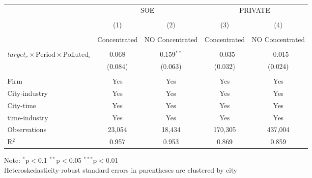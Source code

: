\documentclass[12pt]{article}
\begin{document}
\begin{table}[!htb]
\begin{adjustbox}{width=\textwidth, totalheight=\baselineskip,keepaspectratio}
\begin{tabular}{@{\extracolsep{5pt}}lcccc}
\\[-1.8ex]
            &\multicolumn{2}{c}{SOE}&\multicolumn{2}{c}{PRIVATE}\\
\\[-1.8ex] & (1) & (2) & (3) & (4)\\
 \\[-1.8ex]& Concentrated & NO Concentrated & Concentrated & NO Concentrated\\
 \hline \\[-1.8ex] 
   $target_c \times \text{Period} \times \text{Polluted}_i$  & 0.068 & 0.159$^{**}$ & $-$0.035 & $-$0.015 \\ 
  & (0.084) & (0.063) & (0.032) & (0.024) \\ 
 \hline \\[-1.8ex] 
Firm & Yes & Yes & Yes & Yes \\ 
City-industry & Yes & Yes & Yes & Yes \\ 
City-time & Yes & Yes & Yes & Yes \\ 
time-industry & Yes & Yes & Yes & Yes \\ 
Observations & 23,054 & 18,434 & 170,305 & 437,004 \\ 
R$^{2}$ & 0.957 & 0.953 & 0.869 & 0.859 \\ 
    \end{tabular}
    \end{adjustbox}
    \begin{tablenotes}
      \small
      \item 
      Note: $^{*}$p$<$0.1 $^{**}$p$<$0.05 $^{***}$p$<$0.01 \\
      Heteroskedasticity-robust standard errors in parentheses are clustered by city
    \end{tablenotes}
\end{table}
\end{document}
